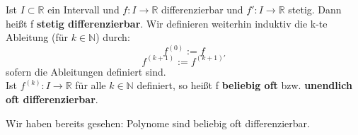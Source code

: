 \begin{Definition}{
	Ist $I \subset \mathbb{R}$ ein Intervall und 
	$f: I \rightarrow \mathbb{R}$ differenzierbar und $f':I \rightarrow \mathbb{R}$
	stetig. Dann heißt f \textbf{stetig differenzierbar}. 
	Wir definieren weiterhin induktiv die 
	k-te Ableitung (für $k \in \mathbb{N}$) durch:
	\begin{equation*}
		f^{(0)} := f 
	\end{equation*}
	\begin{equation*}
	f^{(k+1)} := f^{(k+1)'}
	\end{equation*}
	sofern die Ableitungen definiert sind.\\
	Ist $f^{(k)}: I \rightarrow \mathbb{R}$ für alle $k \in \mathbb{N}$ definiert, 
	so heißt f \textbf{beliebig oft} bzw. \textbf{unendlich oft differenzierbar}. \\
	
}\end{Definition}

\begin{Bemerkung}{Wir haben bereits gesehen: Polynome sind beliebig oft
	 differenzierbar.
}\end{Bemerkung}